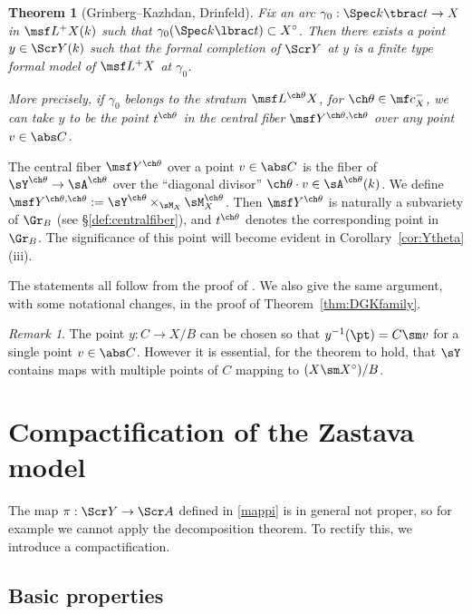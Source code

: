 \documentclass[final]{amsart}
\newtheorem{thm}[subsubsection]{Theorem}
\theoremstyle{remark}
\newtheorem{rem}[subsubsection]{Remark}
\theoremstyle{definition}
\DeclareMathOperator*{\xt}{\times}
\numberwithin{equation}{section}
\begin{document}
\begin{thm}[Grinberg--Kazhdan, Drinfeld]  \label{thm:DGK}
Fix an arc $\gamma_0 : \Spec k\tbrac t \to X$ in $\msf L^+ X(k)$
such that $\gamma_0(\Spec k\lbrac t) \subset X^\circ$. 
Then there exists a point $y \in \Scr Y(k)$ 
such that the formal completion of $\Scr Y$ at $y$ is a finite type formal model of $\msf L^+ X$ at $\gamma_0$. 

More precisely, if $\gamma_0$ belongs to the stratum $\msf L^{\ch\theta} X$, for $\ch\theta\in \mf c_X^-$, we can take $y$ to be the point $t^{\ch\theta}$ in the central fiber $\msf Y^{\ch\theta,\ch\theta}$ over any point $v\in \abs C$.
\end{thm}


The central fiber $\msf Y^{\ch\theta}$ 
over a point $v\in \abs C$ is the fiber of $\sY^{\ch\theta}\to \sA^{\ch\theta}$ over the 
``diagonal divisor'' $\ch\theta \cdot v \in \sA^{\ch\theta}(k)$.
We define $\msf Y^{\ch\theta,\ch\theta} := \sY^{\ch\theta} \xt_{\sM_X} \sM_X^{\ch\theta}$. 
Then $\msf Y^{\ch\theta}$ is naturally a subvariety of $\Gr_B$ (see \S\ref{def:centralfiber}), 
and $t^{\ch\theta}$ denotes the corresponding point in $\Gr_B$. The significance of
this point will become evident in Corollary~\ref{cor:Ytheta}(iii).

\smallskip

The statements all follow from the proof of \cite[\S 4]{Drinfeld}. 
We also give the same argument, with some notational changes, in the proof of Theorem~\ref{thm:DGKfamily}.


\begin{rem}
The point $y : C \to X/B$ can be chosen so that $y^{-1}(\pt) = C\sm v$ for a single
point $v\in \abs C$. However it is essential, for the theorem to hold, that $\sY$ contains
maps with multiple points of $C$ mapping to $(X\sm X^\circ)/B$. 
\end{rem}



\section{Compactification of the Zastava model} \label{sect:compactification}

The map $\pi : \Scr Y \to \Scr A$ defined in \eqref{mappi}
is in general not proper, so for example
we cannot apply the decomposition theorem. To rectify this, we introduce
a compactification.

\subsection{Basic properties} \label{sect:basicproperties-comp}
\end{document}
